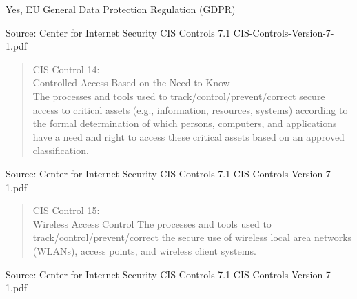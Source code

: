 \documentclass[Screen16to9,17pt]{foils}
\begin{document}
\begin{list1}
\item Yes, EU General Data Protection Regulation (GDPR)
\item
\item
\item
\end{list1}

Source: Center for Internet Security CIS Controls 7.1 CIS-Controls-Version-7-1.pdf


\begin{quote}
CIS Control 14:\\
Controlled Access Based on the Need to Know\\
The processes and tools used to track/control/prevent/correct secure access to critical assets (e.g., information, resources, systems) according to the formal determination of which persons, computers, and applications have a need and right to access these critical assets based on an approved classification.
\end{quote}

\begin{list1}
\item
\item
\item
\item
\end{list1}

Source: Center for Internet Security CIS Controls 7.1 CIS-Controls-Version-7-1.pdf


\begin{quote}
CIS Control 15:\\
Wireless Access Control
The processes and tools used to track/control/prevent/correct the secure use of wireless local area networks (WLANs), access points, and wireless client systems.
\end{quote}

\begin{list1}
\item
\item
\item
\item
\end{list1}

Source: Center for Internet Security CIS Controls 7.1 CIS-Controls-Version-7-1.pdf

\end{document}
